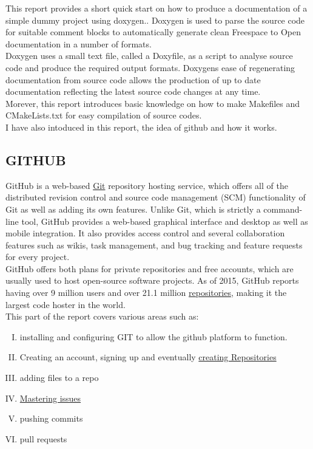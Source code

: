 \documentclass[11pt,utf8]{article}
\begin{document}
This report provides a short quick start on how to produce a documentation of a simple dummy project using doxygen.. Doxygen is used to parse the source code for suitable comment blocks to automatically generate clean Freespace to Open documentation in a number of formats.\\
Doxygen uses a small text file, called a Doxyfile, as a script to analyse source code and produce the required output formats.
Doxygen\textquotesingle s ease of regenerating documentation from source code allows the production of up to date documentation reflecting the latest source code changes at any time.\\
Morever, this report introduces basic knowledge on how to make Makefiles and CMakeLists.txt for easy compilation of source codes.\\
I have also intoduced in this report, the idea of github and how it works.



\subsection{GITHUB}
\label{sec: introduction to github}
GitHub is a web-based \href {https://en.wikipedia.org/wiki/Git_(software)}{Git} repository hosting service, which offers all of the distributed revision control and source code management (SCM) functionality of Git as well as adding its own features. Unlike Git, which is strictly a command-line tool, GitHub provides a web-based graphical interface and desktop as well as mobile integration. It also provides access control and several collaboration features such as wikis, task management, and bug tracking and feature requests for every project.\\
GitHub offers both plans for private repositories and free accounts, which are usually used to host open-source software projects. As of 2015, GitHub reports having over 9 million users and over 21.1 million \href{https://en.wikipedia.org/wiki/Repository_(revision_control)}{repositories}, making it the largest code hoster in the world.\\
This part of the report covers various areas such as:\\
\begin{enumerate}[I.]
 \item installing and configuring GIT to allow the github platform to function.\\
 \item Creating an account, signing up and eventually \href{https://help.github.com/articles/create-a-repo/}{creating Repositories}\\
 \item adding files to a repo\\
 \item \href{https://guides.github.com/features/issues/}{Mastering issues}\\
 \item  pushing commits\\
 \item pull requests\\
 \end {enumerate}
\end{document}
